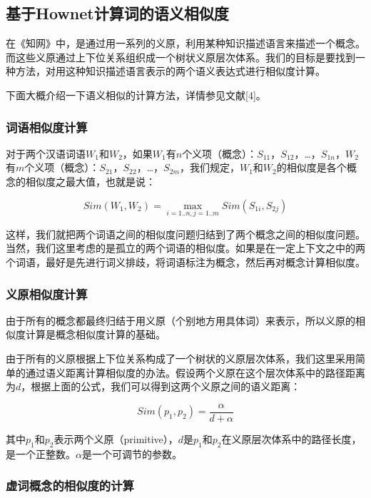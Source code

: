\documentclass[11pt,a4paper]{article}
\begin{document}
\subsection{基于Hownet计算词的语义相似度}

在《知网》中，是通过用一系列的义原，利用某种知识描述语言来描述一个概念。而这些义原通过上下位关系组织成一个树状义原层次体系。我们的目标是要找到一种方法，对用这种知识描述语言表示的两个语义表达式进行相似度计算。

下面大概介绍一下语义相似的计算方法，详情参见文献[4]。

\subsubsection{词语相似度计算}

对于两个汉语词语$W_{1}$和$W_{2}$，如果$W_{1}$有$n$个义项（概念）：$S_{11}$，$S_{12}$，\ldots{}，$S_{1n}$，$W_{2}$有$m$个义项（概念）：$S_{21}$，$S_{22}$，\ldots{}，$S_{2m}$，我们规定，$W_{1}$和$W_{2}$的相似度是各个概念的相似度之最大值，也就是说：

\[
Sim(W_{1},W_{2})=\max_{i=1..n,j=1..m}Sim(S_{1i},S_{2j})
\]

这样，我们就把两个词语之间的相似度问题归结到了两个概念之间的相似度问题。当然，我们这里考虑的是孤立的两个词语的相似度。如果是在一定上下文之中的两个词语，最好是先进行词义排歧，将词语标注为概念，然后再对概念计算相似度。

\subsubsection{义原相似度计算}

由于所有的概念都最终归结于用义原（个别地方用具体词）来表示，所以义原的相似度计算是概念相似度计算的基础。

由于所有的义原根据上下位关系构成了一个树状的义原层次体系，我们这里采用简单的通过语义距离计算相似度的办法。假设两个义原在这个层次体系中的路径距离为$d$，根据上面的公式，我们可以得到这两个义原之间的语义距离：

\[
Sim(p_{1}, p_{2})=\frac{\alpha}{d + \alpha}
\]

其中$p_{1}$和$p_{2}$表示两个义原（primitive），$d$是$p_{1}$和$p_{2}$在义原层次体系中的路径长度，是一个正整数。$\alpha$是一个可调节的参数。

\subsubsection{虚词概念的相似度的计算}
\end{document}
